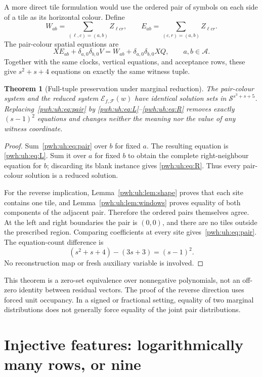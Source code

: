 \documentclass[11pt,letterpaper]{article}
\numberwithin{equation}{section}
\newtheorem{theorem}{Theorem}[section]
\theoremstyle{definition}
\newcommand{\A}{\mathcal A}
\newcommand{\F}{\mathcal F}
\newcommand{\Sring}{\mathcal S}
\newcommand{\System}{\ensuremath{\mathcal E_{f,\F}(w)}}
\begin{document}
A more direct tile formulation would use the ordered pair of symbols on
each side of a tile as its horizontal colour. Define
\[
 W_{ab}=\sum_{(\ell,c)=(a,b)}Z_{\ell c r},\qquad
 E_{ab}=\sum_{(c,r)=(a,b)}Z_{\ell c r}.
\]
The pair-colour spatial equations are
\begin{equation}
 XE_{ab}+\delta_{a,0}\delta_{b,0}V
   =W_{ab}+\delta_{a,0}\delta_{b,0}XQ,
 \qquad a,b\in\A.
 \label{pwh:uh:eq:pair}
\end{equation}
Together with the same clocks, vertical equations, and acceptance rows,
these give $s^2+s+4$ equations on exactly the same witness tuple.

\begin{theorem}[Full-tuple preservation under marginal reduction]
\label{pwh:uh:thm:projection}
The pair-colour system and the reduced system \System{} have identical
solution sets in $\Sring^{s^3+s+5}$. Replacing~\eqref{pwh:uh:eq:pair} by
\eqref{pwh:uh:eq:L}--\eqref{pwh:uh:eq:R} removes exactly $(s-1)^2$ equations and changes
neither the meaning nor the value of any witness coordinate.
\end{theorem}

\begin{proof}
Sum~\eqref{pwh:uh:eq:pair} over $b$ for fixed $a$. The resulting equation is
\eqref{pwh:uh:eq:L}. Sum it over $a$ for fixed $b$ to obtain the complete
right-neighbour equation for $b$; discarding its blank instance gives
\eqref{pwh:uh:eq:R}. Thus every pair-colour solution is a reduced solution.

For the reverse implication, Lemma~\ref{pwh:uh:lem:shape} proves that each site
contains one tile, and Lemma~\ref{pwh:uh:lem:windows} proves equality of both
components of the adjacent pair. Therefore the ordered pairs themselves
agree. At the left and right boundaries the pair is $(0,0)$, and there
are no tiles outside the prescribed region. Comparing coefficients at
every site gives~\eqref{pwh:uh:eq:pair}. The equation-count difference is
\[
 (s^2+s+4)-(3s+3)=(s-1)^2.
\]
No reconstruction map or fresh auxiliary variable is involved.
\end{proof}

This theorem is a zero-set equivalence over nonnegative polynomials, not
an off-zero identity between residual vectors. The proof of the reverse
direction uses forced unit occupancy. In a signed or fractional setting,
equality of two marginal distributions does not generally force equality
of the joint pair distributions.


\section{Injective features: logarithmically many rows, or nine}
\label{pwh:uh:sec:features}
\end{document}
